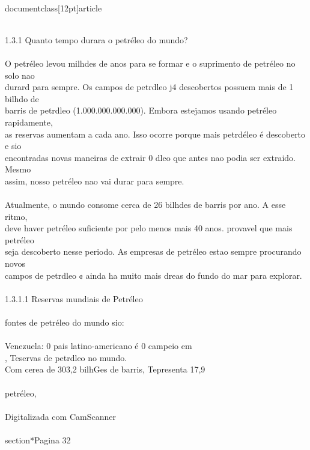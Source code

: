 \\documentclass[12pt]{article}
\begin{document}
{\\
1.3.1 Quanto tempo durara o petréleo do mundo?\\
\\
O petréleo levou milhdes de anos para se formar e o suprimento de petréleo no solo nao\\
durard para sempre. Os campos de petrdleo j4 descobertos possuem mais de 1 bilhdo de\\
barris de petrdleo (1.000.000.000.000). Embora estejamos usando petréleo rapidamente,\\
as reservas aumentam a cada ano. Isso ocorre porque mais petrdéleo é descoberto e sio\\
encontradas novas maneiras de extrair 0 dleo que antes nao podia ser extraido. Mesmo\\
assim, nosso petréleo nao vai durar para sempre.\\
\\
Atualmente, o mundo consome cerca de 26 bilhdes de barris por ano. A esse ritmo,\\
deve haver petréleo suficiente por pelo menos mais 40 anos. provavel que mais petréleo\\
seja descoberto nesse periodo. As empresas de petréleo estao sempre procurando novos\\
campos de petrdleo ¢ ainda ha muito mais dreas do fundo do mar para explorar.\\
\\
1.3.1.1 Reservas mundiais de Petréleo\\
\\
fontes de petréleo do mundo sio:\\
\\
Venezuela: 0 pais latino-americano é 0 campeio em\\
, Teservas de petrdleo no mundo.\\
Com cerea de 303,2 bilhGes de barris, Tepresenta 17,9\\%
\\
petréleo,\\
\\
Digitalizada com CamScanner\\

\\section*{Pagina 32}

}
\end{document}
